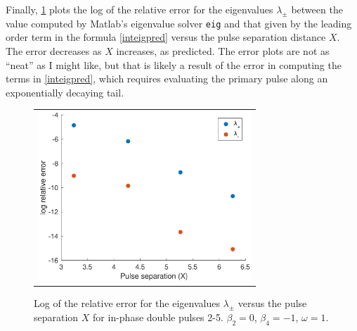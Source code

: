 \documentclass[12pt]{article}
\begin{document}
Finally, \cref{fig:inteigpred} plots the log of the relative error for the eigenvalues $\lambda_\pm$ between the value computed by Matlab's eigenvalue solver \texttt{eig} and that given by the leading order term in the formula \cref{inteigpred} versus the pulse separation distance $X$. The error decreases as $X$ increases, as predicted. The error plots are not as ``neat'' as I might like, but that is likely a result of the error in computing the terms in \cref{inteigpred}, which requires evaluating the primary pulse along an exponentially decaying tail.

\begin{figure}[H]
\centering
\begin{tabular}{c}
\includegraphics[width=8cm]{images/inteigpred.eps}
\end{tabular}
\caption{Log of the relative error for the eigenvalues $\lambda_\pm$ versus the pulse separation $X$ for in-phase double pulses 2-5. $\beta_2 = 0$, $\beta_4 = -1$, $\omega = 1$.}
\label{fig:inteigpred}
\end{figure}

% 

\end{document}
